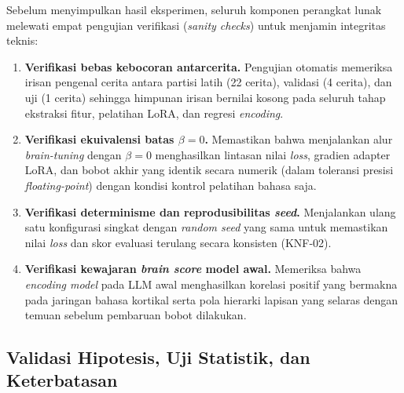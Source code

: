 Sebelum menyimpulkan hasil eksperimen, seluruh komponen perangkat lunak melewati empat pengujian verifikasi (\textit{sanity checks}) untuk menjamin integritas teknis:
\begin{enumerate}
  \item \textbf{Verifikasi bebas kebocoran antarcerita.} Pengujian otomatis memeriksa irisan pengenal cerita antara partisi latih (22 cerita), validasi (4 cerita), dan uji (1 cerita) sehingga himpunan irisan bernilai kosong pada seluruh tahap ekstraksi fitur, pelatihan LoRA, dan regresi \textit{encoding}.
  \item \textbf{Verifikasi ekuivalensi batas $\beta = 0$.} Memastikan bahwa menjalankan alur \textit{brain-tuning} dengan $\beta = 0$ menghasilkan lintasan nilai \textit{loss}, gradien adapter LoRA, dan bobot akhir yang identik secara numerik (dalam toleransi presisi \textit{floating-point}) dengan kondisi kontrol pelatihan bahasa saja.
  \item \textbf{Verifikasi determinisme dan reprodusibilitas \textit{seed}.} Menjalankan ulang satu konfigurasi singkat dengan \textit{random seed} yang sama untuk memastikan nilai \textit{loss} dan skor evaluasi terulang secara konsisten (KNF-02).
  \item \textbf{Verifikasi kewajaran \textit{brain score} model awal.} Memeriksa bahwa \textit{encoding model} pada LLM awal menghasilkan korelasi positif yang bermakna pada jaringan bahasa kortikal serta pola hierarki lapisan yang selaras dengan temuan \textcite{mischler2024contextual} sebelum pembaruan bobot dilakukan.
\end{enumerate}

\subsection{Validasi Hipotesis, Uji Statistik, dan Keterbatasan}
\label{sub:rs_validasi}

